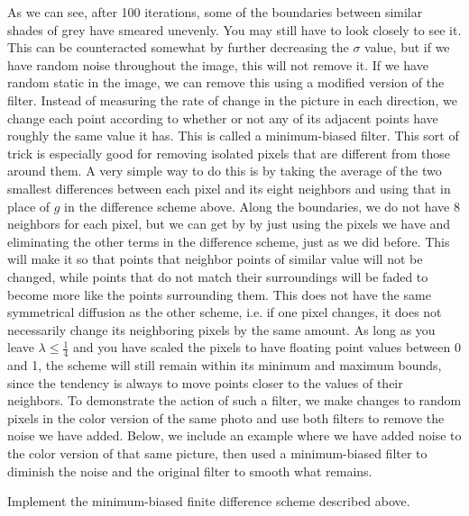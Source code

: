 As we can see, after 100 iterations, some of the boundaries between similar shades of grey have smeared unevenly. You may still have to look closely to see it.
This can be counteracted somewhat by further decreasing the $\sigma$ value, but if we have random noise throughout the image, this will not remove it.
If we have random static in the image, we can remove this using a modified version of the filter.
Instead of measuring the rate of change in the picture in each direction, we change each point according to whether or not any of its adjacent points have roughly the same value it has. 
This is called a minimum-biased filter. 
This sort of trick is especially good for removing isolated pixels that are different from those around them.
A very simple way to do this is by taking the average of the two smallest differences between each pixel and its eight neighbors and using that in place of $g$ in the difference scheme above.
Along the boundaries, we do not have 8 neighbors for each pixel, but we can get by by just using the pixels we have and eliminating the other terms in the difference scheme, just as we did before.
This will make it so that points that neighbor points of similar value will not be changed, while points that do not match their surroundings will be faded to become more like the points surrounding them.
This does not have the same symmetrical diffusion as the other scheme, i.e. if one pixel changes, it does not necessarily change its neighboring pixels by the same amount.
As long as you leave $\lambda \leq \frac{1}{4}$ and you have scaled the pixels to have floating point values between 0 and 1, the scheme will still remain within its minimum and maximum bounds, since the tendency is always to move points closer to the values of their neighbors.
To demonstrate the action of such a filter, we make changes to random pixels in the color version of the same photo and use both filters to remove the noise we have added.
Below, we include an example where we have added noise to the color version of that same picture, then used a minimum-biased filter to diminish the noise and the original filter to smooth what remains.

\begin{problem}
Implement the minimum-biased finite difference scheme described above. 
\end{problem}

